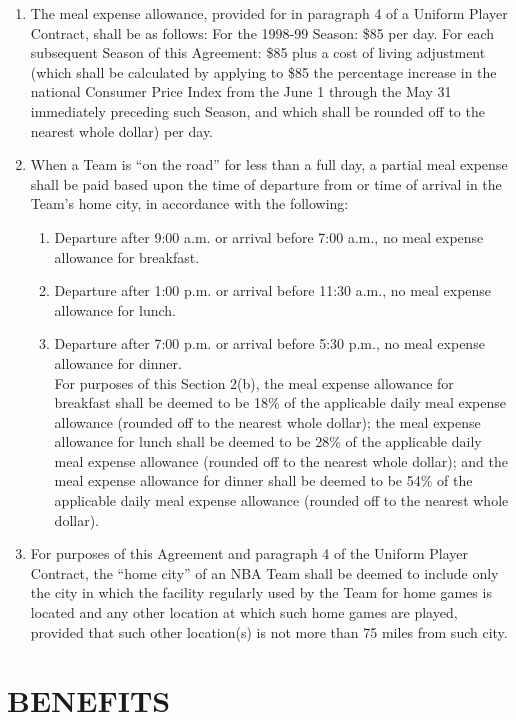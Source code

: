 \documentclass[
]{book}
\providecommand{\tightlist}{%
  \setlength{\itemsep}{0pt}\setlength{\parskip}{0pt}}
\begin{document}
\begin{enumerate}
\def\labelenumi{(\alph{enumi})}
\tightlist
\item
  The meal expense allowance, provided for in paragraph 4 of a Uniform Player Contract, shall be as follows:
  For the 1998-99 Season: \$85 per day.
  For each subsequent Season of this Agreement: \$85 plus a cost of living adjustment (which shall be calculated by applying to \$85 the percentage increase in the national Consumer Price Index from the June 1 through the May 31 immediately preceding such Season, and which shall be rounded off to the nearest whole dollar) per day.
\item
  When a Team is ``on the road'' for less than a full day, a partial meal expense shall be paid based upon the time of departure from or time of arrival in the Team's home city, in accordance with the following:

  \begin{enumerate}
  \def\labelenumii{(\roman{enumii})}
  \tightlist
  \item
    Departure after 9:00 a.m. or arrival before 7:00 a.m., no meal expense allowance for breakfast.
  \item
    Departure after 1:00 p.m. or arrival before 11:30 a.m., no meal expense allowance for lunch.
  \item
    Departure after 7:00 p.m. or arrival before 5:30 p.m., no meal expense allowance for dinner.\\
    For purposes of this Section 2(b), the meal expense allowance for breakfast shall be deemed to be 18\% of the applicable daily meal expense allowance (rounded off to the nearest whole dollar); the meal expense allowance for lunch shall be deemed to be 28\% of the applicable daily meal expense allowance (rounded off to the nearest whole dollar); and the meal expense allowance for dinner shall be deemed to be 54\% of the applicable daily meal expense allowance (rounded off to the nearest whole dollar).
  \end{enumerate}
\item
  For purposes of this Agreement and paragraph 4 of the Uniform Player Contract, the ``home city'' of an NBA Team shall be deemed to include only the city in which the facility regularly used by the Team for home games is located and any other location at which such home games are played, provided that such other location(s) is not more than 75 miles from such city.
\end{enumerate}

\hypertarget{benefits}{%
\chapter{BENEFITS}\label{benefits}}
\end{document}
